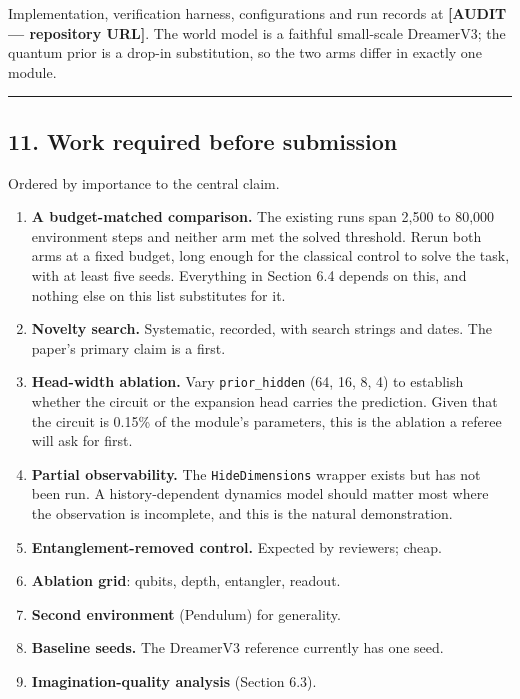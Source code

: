 \documentclass[
  11pt]{article}
\providecommand{\tightlist}{%
  \setlength{\itemsep}{0pt}\setlength{\parskip}{0pt}}
\begin{document}
Implementation, verification harness, configurations and run records at
\textbf{{[}AUDIT --- repository URL{]}}. The world model is a faithful
small-scale DreamerV3; the quantum prior is a drop-in substitution, so
the two arms differ in exactly one module.

\begin{center}\rule{0.5\linewidth}{0.5pt}\end{center}

\hypertarget{work-required-before-submission}{%
\subsection{11. Work required before
submission}\label{work-required-before-submission}}

Ordered by importance to the central claim.

\begin{enumerate}
\def\labelenumi{\arabic{enumi}.}
\tightlist
\item
  \textbf{A budget-matched comparison.} The existing runs span 2,500 to
  80,000 environment steps and neither arm met the solved threshold.
  Rerun both arms at a fixed budget, long enough for the classical
  control to solve the task, with at least five seeds. Everything in
  Section 6.4 depends on this, and nothing else on this list substitutes
  for it.
\item
  \textbf{Novelty search.} Systematic, recorded, with search strings and
  dates. The paper's primary claim is a first.
\item
  \textbf{Head-width ablation.} Vary \texttt{prior\_hidden} (64, 16, 8,
  4) to establish whether the circuit or the expansion head carries the
  prediction. Given that the circuit is 0.15\% of the module's
  parameters, this is the ablation a referee will ask for first.
\item
  \textbf{Partial observability.} The \texttt{HideDimensions} wrapper
  exists but has not been run. A history-dependent dynamics model should
  matter most where the observation is incomplete, and this is the
  natural demonstration.
\item
  \textbf{Entanglement-removed control.} Expected by reviewers; cheap.
\item
  \textbf{Ablation grid}: qubits, depth, entangler, readout.
\item
  \textbf{Second environment} (Pendulum) for generality.
\item
  \textbf{Baseline seeds.} The DreamerV3 reference currently has one
  seed.
\item
  \textbf{Imagination-quality analysis} (Section 6.3).
\end{enumerate}
\end{document}
